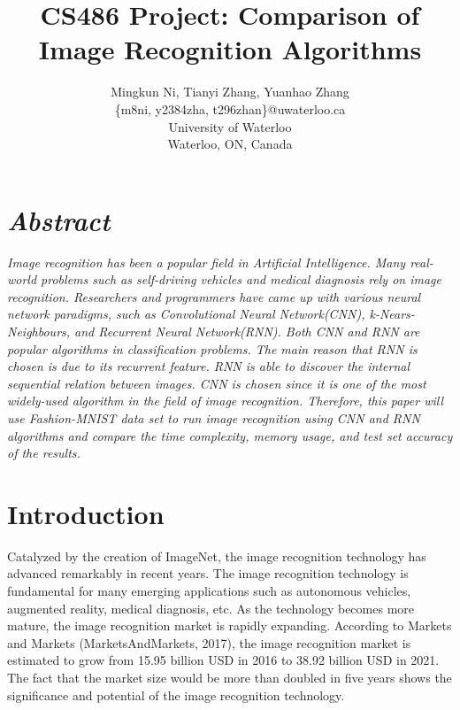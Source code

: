 \documentclass[letterpaper]{article} %
\begin{document}
%
\title{CS486 Project: Comparison of Image Recognition Algorithms}
\author{Mingkun Ni, Tianyi Zhang, Yuanhao Zhang\\
\{m8ni, y2384zha, t296zhan\}@uwaterloo.ca\\
University of Waterloo\\
Waterloo, ON, Canada\\
}
\maketitle


\section{\em{Abstract}}
\textit{Image recognition has been a popular field in Artificial Intelligence. Many real-world problems such as self-driving vehicles and medical diagnosis rely on image recognition. Researchers and programmers have came up with various neural network paradigms, such as Convolutional Neural Network(CNN), k-Nears-Neighbours, and Recurrent Neural Network(RNN). Both CNN and RNN are popular algorithms in classification problems. The main reason that RNN is chosen is due to its recurrent feature. RNN is able to discover the internal sequential relation between images. CNN is chosen since it is one of the most widely-used algorithm in the field of image recognition. Therefore, this paper will use Fashion-MNIST data set to run image recognition using CNN and RNN algorithms and compare the time complexity, memory usage, and test set accuracy of the results.}


\section{Introduction}
Catalyzed by the creation of ImageNet, the image recognition technology has advanced remarkably in recent years. The image recognition technology is fundamental for many emerging applications such as autonomous vehicles, augmented reality, medical diagnosis, etc. As the technology becomes more mature, the image recognition market is rapidly expanding. According to Markets and Markets (MarketsAndMarkets, 2017), the image recognition market is estimated to grow from 15.95 billion USD in 2016 to 38.92 billion USD in 2021. The fact that the market size would be more than doubled in five years shows the significance and potential of the image recognition technology.
\end{document}

